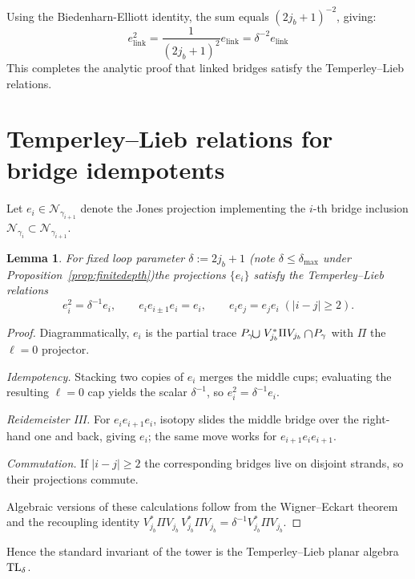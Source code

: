 \documentclass[11pt]{article}
\newtheorem{lemma}{Lemma}[section]
\begin{document}
Using the Biedenharn-Elliott identity, the sum equals $(2j_b+1)^{-2}$, giving:
\[
  e_{\text{link}}^2 = \frac{1}{(2j_b+1)^2} e_{\text{link}} = \delta^{-2} e_{\text{link}}
\]
This completes the analytic proof that linked bridges satisfy the
Temperley–Lieb relations.

\appendix
\section{Temperley--Lieb relations for bridge idempotents}\label{app:TL}

Let $e_i\in\mathcal N_{\gamma_{i+1}}$ denote the Jones projection
implementing the $i$-th bridge inclusion
$\mathcal N_{\gamma_i}\subset\mathcal N_{\gamma_{i+1}}$.

\begin{lemma}
  For fixed loop parameter $\delta := 2j_b+1$ (note $\delta\le\delta_{\max}$ under Proposition~\ref{prop:finitedepth})\;the projections $\{e_i\}$
  satisfy the Temperley--Lieb relations
  \[
    e_i^2 = \delta^{-1} e_i,\qquad
    e_i e_{i\pm1} e_i = e_i,\qquad
    e_i e_j = e_j e_i\;( |i-j|\ge 2).
  \]
\end{lemma}

\begin{proof}
  Diagrammatically, $e_i$ is the partial trace
  \(
    \smash{P_\gamma\!\mathbin{\raisebox{-0.3ex}{\scalebox{1.2}{$\cup$}}}}
    \;V_{j_b}^{*}\Pi V_{j_b}
    \mathbin{\raisebox{-0.3ex}{\scalebox{1.2}{$\cap$}}}\!P_\gamma
  \)
  with $\Pi$ the $\ell=0$ projector.

  \emph{Idempotency.}
  Stacking two copies of $e_i$ merges the middle cups;
  evaluating the resulting $\ell=0$ cap yields the scalar $\delta^{-1}$,
  so $e_i^2=\delta^{-1}e_i$.

  \emph{Reidemeister III.}
  For $e_ie_{i+1}e_i$, isotopy slides the middle bridge over the right‐hand one
  and back, giving $e_i$; the same move works for $e_{i+1}e_ie_{i+1}$.

  \emph{Commutation.}
  If $|i-j|\ge2$ the corresponding bridges live on disjoint strands, so their
  projections commute.

  Algebraic versions of these calculations follow from the
  Wigner--Eckart theorem and the recoupling identity
  $V_{j_b}^{*}\Pi V_{j_b}\,V_{j_b}^{*}\Pi V_{j_b}= \delta^{-1} V_{j_b}^{*}\Pi V_{j_b}$.
\end{proof}

Hence the standard invariant of the tower is the Temperley--Lieb
planar algebra ${\rm TL}_\delta$.
\end{document}
